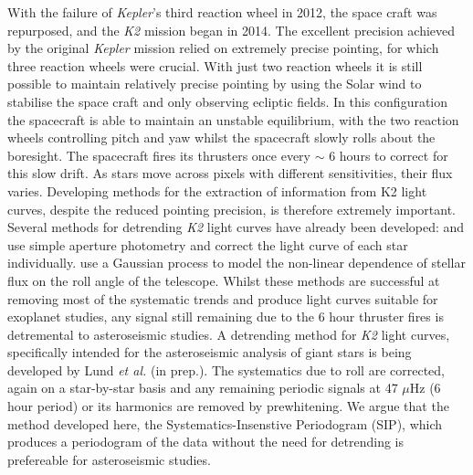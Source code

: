 \documentclass[useAMS, usenatbib]{aastex}
\begin{document}
With the failure of {\it Kepler}'s third reaction wheel in 2012, the space
craft was repurposed, and the {\it K2} mission began in 2014.
The excellent precision achieved by the original {\it Kepler} mission relied
on extremely precise pointing, for which three reaction wheels were crucial.
With just two reaction wheels it is still possible to maintain relatively
precise pointing by using the Solar wind to stabilise the space craft and only
observing ecliptic fields.
In this configuration the spacecraft is able to maintain an unstable
equilibrium, with the two reaction wheels controlling pitch and yaw whilst the
spacecraft slowly rolls about the boresight.
The spacecraft fires its thrusters once every $\sim$ 6 hours to correct for
this slow drift.
As stars move across pixels with different sensitivities, their flux varies.
Developing methods for the extraction of information from K2 light
curves, despite the reduced pointing precision, is therefore extremely
important.
Several methods for detrending {\it K2} light curves have already been
developed: \citet{Vanderburg2014} and \citet{Crossfield2015} use simple
aperture photometry and correct the light curve of each star individually.
\citet{Aigrain2015} use a Gaussian process to model the non-linear dependence
of stellar flux on the roll angle of the telescope.
Whilst these methods are successful at removing most of the systematic trends
and produce light curves suitable for exoplanet studies, any signal still
remaining due to the 6 hour thruster fires is detremental to asteroseismic
studies.
A detrending method for {\it K2} light curves, specifically intended for the
asteroseismic analysis of giant stars is being developed by Lund {\it et al.}
(in prep.).
The systematics due to roll are corrected, again on a star-by-star basis and
any remaining periodic signals at 47 $\mu$Hz (6 hour period) or its harmonics
are removed by prewhitening.
We argue that the method developed here, the Systematics-Insenstive
Periodogram (SIP), which produces a periodogram of the data without the need
for detrending is prefereable for asteroseismic studies.
\end{document}
